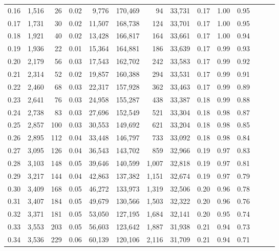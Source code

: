 \begin{tabular}{rrrrrrrrrrrrrr}
0.16 &  1,516 &   26 &  0.02 &    9,776 &  170,469 &      94 &  33,731 &  0.17 &  1.00 &      0.95 \\
0.17 &  1,731 &   30 &  0.02 &   11,507 &  168,738 &     124 &  33,701 &  0.17 &  1.00 &      0.95 \\
0.18 &  1,921 &   40 &  0.02 &   13,428 &  166,817 &     164 &  33,661 &  0.17 &  1.00 &      0.94 \\
0.19 &  1,936 &   22 &  0.01 &   15,364 &  164,881 &     186 &  33,639 &  0.17 &  0.99 &      0.93 \\
0.20 &  2,179 &   56 &  0.03 &   17,543 &  162,702 &     242 &  33,583 &  0.17 &  0.99 &      0.92 \\
0.21 &  2,314 &   52 &  0.02 &   19,857 &  160,388 &     294 &  33,531 &  0.17 &  0.99 &      0.91 \\
0.22 &  2,460 &   68 &  0.03 &   22,317 &  157,928 &     362 &  33,463 &  0.17 &  0.99 &      0.89 \\
0.23 &  2,641 &   76 &  0.03 &   24,958 &  155,287 &     438 &  33,387 &  0.18 &  0.99 &      0.88 \\
0.24 &  2,738 &   83 &  0.03 &   27,696 &  152,549 &     521 &  33,304 &  0.18 &  0.98 &      0.87 \\
0.25 &  2,857 &  100 &  0.03 &   30,553 &  149,692 &     621 &  33,204 &  0.18 &  0.98 &      0.85 \\
0.26 &  2,895 &  112 &  0.04 &   33,448 &  146,797 &     733 &  33,092 &  0.18 &  0.98 &      0.84 \\
0.27 &  3,095 &  126 &  0.04 &   36,543 &  143,702 &     859 &  32,966 &  0.19 &  0.97 &      0.83 \\
0.28 &  3,103 &  148 &  0.05 &   39,646 &  140,599 &   1,007 &  32,818 &  0.19 &  0.97 &      0.81 \\
0.29 &  3,217 &  144 &  0.04 &   42,863 &  137,382 &   1,151 &  32,674 &  0.19 &  0.97 &      0.79 \\
0.30 &  3,409 &  168 &  0.05 &   46,272 &  133,973 &   1,319 &  32,506 &  0.20 &  0.96 &      0.78 \\
0.31 &  3,407 &  184 &  0.05 &   49,679 &  130,566 &   1,503 &  32,322 &  0.20 &  0.96 &      0.76 \\
0.32 &  3,371 &  181 &  0.05 &   53,050 &  127,195 &   1,684 &  32,141 &  0.20 &  0.95 &      0.74 \\
0.33 &  3,553 &  203 &  0.05 &   56,603 &  123,642 &   1,887 &  31,938 &  0.21 &  0.94 &      0.73 \\
0.34 &  3,536 &  229 &  0.06 &   60,139 &  120,106 &   2,116 &  31,709 &  0.21 &  0.94 &      0.71 \\

\end{tabular}
